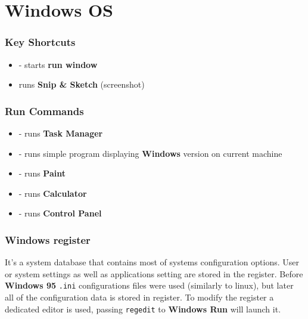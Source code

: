 \part{Windows OS}

\section{Key Shortcuts}
\begin{itemize}
\item {} - starts \textbf{run window}
\item {} runs \textbf{Snip \& Sketch} (screenshot)
\end{itemize}

\section{Run Commands}
\begin{itemize}
\item {} - runs \textbf{Task Manager}
\item {} - runs simple program displaying \textbf{Windows} version on current machine
\item {} - runs \textbf{Paint}
\item {} - runs \textbf{Calculator}
\item {} - runs \textbf{Control Panel}
\end{itemize}

\section{Windows register}

It's a system database that contains most of systems configuration options. User or system settings as well as applications setting are stored in the register. Before \textbf{Windows 95} \texttt{.ini} configurations files were used (similarly to linux), but later all of the configuration data is stored in register. To modify the register a dedicated editor is used, passing \texttt{regedit} to \textbf{Windows Run} will launch it.\
